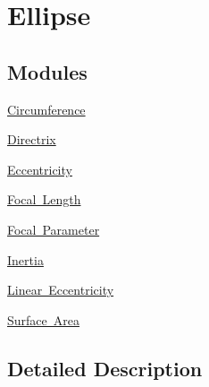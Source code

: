 \hypertarget{group___e_g_x_math-_geometry-2_d-_ellipse}{}\section{Ellipse}
\label{group___e_g_x_math-_geometry-2_d-_ellipse}
\subsection*{Modules}
\begin{DoxyCompactItemize}
\item 
\mbox{\hyperlink{group___e_g_x_math-_geometry-2_d-_ellipse-_circumference}{Circumference}}
\item 
\mbox{\hyperlink{group___e_g_x_math-_geometry-2_d-_ellipse-_directrix}{Directrix}}
\item 
\mbox{\hyperlink{group___e_g_x_math-_geometry-2_d-_ellipse-_eccentricity}{Eccentricity}}
\item 
\mbox{\hyperlink{group___e_g_x_math-_geometry-2_d-_ellipse-_focal_length}{Focal Length}}
\item 
\mbox{\hyperlink{group___e_g_x_math-_geometry-2_d-_ellipse-_focal_parameter}{Focal Parameter}}
\item 
\mbox{\hyperlink{group___e_g_x_math-_geometry-2_d-_ellipse-_inertia}{Inertia}}
\item 
\mbox{\hyperlink{group___e_g_x_math-_geometry-2_d-_ellipse-_linear_eccentricity}{Linear Eccentricity}}
\item 
\mbox{\hyperlink{group___e_g_x_math-_geometry-2_d-_ellipse-_surface_area}{Surface Area}}
\end{DoxyCompactItemize}


\subsection{Detailed Description}
